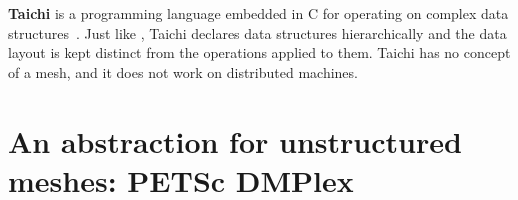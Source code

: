 \documentclass[thesis]{subfiles}
\begin{document}

\textbf{Taichi} is a programming language embedded in C\+\+ for operating on complex data structures~\cite{huTaichiLanguageHighperformance2019}.
Just like , Taichi declares data structures hierarchically and the data layout is kept distinct from the operations applied to them.
Taichi has no concept of a mesh, and it does not work on distributed machines.


\section{An abstraction for unstructured meshes: PETSc DMPlex}



\end{document}
